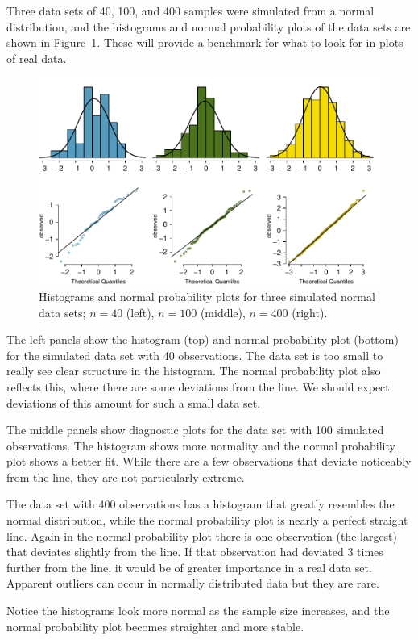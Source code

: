 \begin{example}{Three data sets of 40, 100, and 400 samples were simulated from a normal distribution, and the histograms and normal probability plots of the data sets are shown in Figure~\ref{normalExamples}. These will provide a benchmark for what to look for in plots of real data.} \label{normalExamplesExample}

\begin{figure}
\centering
\includegraphics[width=\textwidth]{ch_distributions/figures/normalExamples/normalExamples}
\caption{Histograms and normal probability plots for three simulated normal data sets; $n=40$ (left), $n=100$ (middle), $n=400$ (right).}
\label{normalExamples}
\end{figure}

The left panels show the histogram (top) and normal probability plot (bottom) for the simulated data set with 40 observations. The data set is too small to really see clear structure in the histogram. The normal probability plot also reflects this, where there are some deviations from the line. We should expect deviations of this amount for such a small data set.

The middle panels show diagnostic plots for the data set with 100 simulated observations. The histogram shows more normality and the normal probability plot shows a better fit. While there are a few observations that deviate noticeably from the line, they are not particularly extreme.

The data set with 400 observations has a histogram that greatly resembles the normal distribution, while the normal probability plot is nearly a perfect straight line. Again in the normal probability plot there is one observation (the largest) that deviates slightly from the line. If that observation had deviated 3 times further from the line, it would be of greater importance in a real data set. Apparent outliers can occur in normally distributed data but they are rare.

Notice the histograms look more normal as the sample size increases, and the normal probability plot becomes straighter and more stable.
\end{example}

